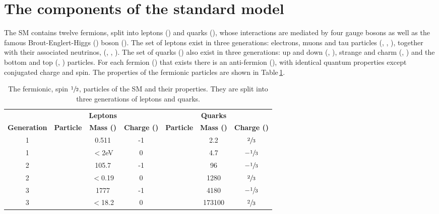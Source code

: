 \section{The components of the standard model}
\label{sec:SM}

The SM contains twelve fermions, split into leptons (\lepton{}) and quarks (\quark{}),  whose interactions are mediated by four gauge bosons as well as the famous Brout-Englert-Higgs (\BEH) boson (\Hboson). 
The set of leptons exist in three generations: electrons, muons and tau particles (\electron{}, \muon{}, \tauon{}), together with their associated neutrinos, (\nue{}, \numu{}, \nutau{}). 
The set of quarks (\quark{}) also exist in three generations: up and down (\uquark{}, \dquark{}), strange and charm (\squark{}, \cquark{}) and the bottom and top (\bquark{}, \tquark{}) particles. 
For each fermion (\fermion{}) that exists there is an anti-fermion (\antifermion{}), with identical quantum properties except conjugated charge and spin.
The properties of the fermionic particles are shown in Table\,\ref{tb:SM_Fermions}.

\begin{table}
	\centering
	\footnotesize
	\caption{The fermionic, spin $\sfrac{1}{2}$, particles of the SM and their properties. They are split into three generations of leptons and quarks.}
	\label{tb:SM_Fermions}
	\begin{tabular}{ccccccc}
								& 						& \textbf{Leptons} 			&										&						& \textbf{Quarks} 			& \\
		\textbf{Generation} 	&	\textbf{Particle} 	& \textbf{Mass (\MeVcc{})} 	& \textbf{Charge (\electron{})}			& \textbf{Particle} 	& \textbf{Mass (\MeVcc{})} 	& \textbf{Charge (\electron{})} \\
		\hline
		1 						& \electron{} 			& 0.511  					&	-1									& \uquark{} 			& 2.2						& $\sfrac{2}{3}$ \\
		1 						& \nue{}			 	& $<$2eV  					&	0									& \dquark{} 			& 4.7						& $-\sfrac{1}{3}$ \\
		2 						& \muon{} 		 		& 105.7	 					&	-1									& \squark{}	 			& 96						& $-\sfrac{1}{3}$ \\	
		2 						& \numu{} 				& $<$0.19  					&	0									& \cquark{}	 			& 1280						& $\sfrac{2}{3}$ \\
		3 						& \tauon{}	 	 		& 1777 	 					&	-1									& \bquark{}	 			& 4180						& $-\sfrac{1}{3}$ \\	
		3 						& \nutau{}	 	 		& $<$18.2  					&	0									& \tquark{}	 			& 173100					& $\sfrac{2}{3}$ \\
	\end{tabular}
\end{table}


